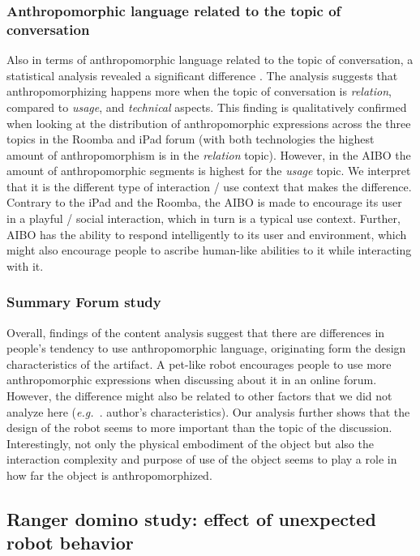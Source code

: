 \documentclass{frontiersSCNS} %
\newcommand{\eg}{{\textit{e.g.~}}}
\begin{document}
\subsubsection{Anthropomorphic language related to the topic of conversation\\}

Also in terms of anthropomorphic language related to the topic of conversation,
a statistical analysis revealed a significant difference
\citep{fink_anthropomorphic_2012}. The analysis suggests that anthropomorphizing
happens more when the topic of conversation is \textit{relation}, compared to
\textit{usage}, and \textit{technical} aspects. This finding is qualitatively
confirmed when looking at the distribution of anthropomorphic expressions across
the three topics in the Roomba and iPad forum (with both technologies the
highest amount of anthropomorphism is in the \textit{relation} topic). However,
in the AIBO the amount of anthropomorphic segments is highest for the
\textit{usage} topic.  We interpret that it is the different type of interaction
/ use context that makes the difference. Contrary to the iPad and the Roomba,
the AIBO is made to encourage its user in a playful / social interaction, which
in turn is a typical use context. Further, AIBO has the ability to respond
intelligently to its user and environment, which might also encourage people to
ascribe human-like abilities to it while interacting with it.


\subsubsection{Summary Forum study\\}

Overall, findings of the content analysis suggest that there are differences in
people's tendency to use anthropomorphic language, originating form the design
characteristics of the artifact. A pet-like robot encourages people to use more 
anthropomorphic expressions when discussing about it in an online forum. However, 
the difference might also be related to other factors that we did not analyze 
here (\eg. author's characteristics). Our analysis further shows that the design 
of the robot seems to more important than the topic of the discussion. 
Interestingly, not only the physical embodiment
of the object but also the interaction complexity and purpose of use of the
object seems to play a role in how far the object is anthropomorphized.


\subsection{Ranger domino study: effect of unexpected robot behavior}
\end{document}
